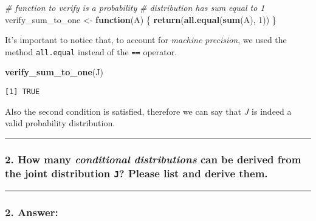 \documentclass[
]{article}
\newenvironment{Shaded}{\begin{snugshade}}{\end{snugshade}}
\newcommand{\CommentTok}[1]{\textcolor[rgb]{0.56,0.35,0.01}{\textit{#1}}}
\newcommand{\ControlFlowTok}[1]{\textcolor[rgb]{0.13,0.29,0.53}{\textbf{#1}}}
\newcommand{\DecValTok}[1]{\textcolor[rgb]{0.00,0.00,0.81}{#1}}
\newcommand{\FunctionTok}[1]{\textcolor[rgb]{0.13,0.29,0.53}{\textbf{#1}}}
\newcommand{\NormalTok}[1]{#1}
\newcommand{\OtherTok}[1]{\textcolor[rgb]{0.56,0.35,0.01}{#1}}
\begin{document}
\begin{Shaded}
\begin{Highlighting}[]
\CommentTok{\# function to verify is a probability}
\CommentTok{\# distribution has sum equal to 1}
\NormalTok{verify\_sum\_to\_one }\OtherTok{\textless{}{-}} \ControlFlowTok{function}\NormalTok{(A) \{}
    \FunctionTok{return}\NormalTok{(}\FunctionTok{all.equal}\NormalTok{(}\FunctionTok{sum}\NormalTok{(A), }\DecValTok{1}\NormalTok{))}
\NormalTok{\}}
\end{Highlighting}
\end{Shaded}

It's important to notice that, to account for \emph{machine precision},
we used the method \texttt{all.equal} instead of the \texttt{==}
operator.

\begin{Shaded}
\begin{Highlighting}[]
\FunctionTok{verify\_sum\_to\_one}\NormalTok{(J)}
\end{Highlighting}
\end{Shaded}

\begin{verbatim}
[1] TRUE
\end{verbatim}

Also the second condition is satisfied, therefore we can say that \(J\)
is indeed a valid probability distribution.

\begin{center}\rule{0.5\linewidth}{0.5pt}\end{center}

\bigskip

\hypertarget{how-many-conditional-distributions-can-be-derived-from-the-joint-distribution-j-please-list-and-derive-them.}{%
\subsubsection{\texorpdfstring{2. How many \emph{conditional
distributions} can be derived from the joint distribution \texttt{J}?
Please list and derive
them.}{2. How many conditional distributions can be derived from the joint distribution J? Please list and derive them.}}\label{how-many-conditional-distributions-can-be-derived-from-the-joint-distribution-j-please-list-and-derive-them.}}

\begin{center}\rule{0.5\linewidth}{0.5pt}\end{center}

\hypertarget{answer-1}{%
\subsubsection{2. Answer:}\label{answer-1}}
\end{document}
